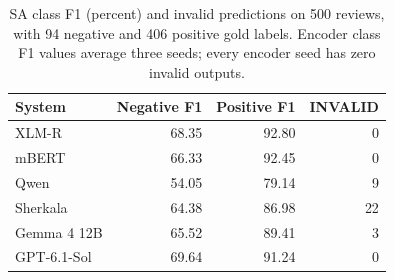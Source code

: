 \begin{table}[t]
\centering\footnotesize
\caption{SA class F1 (percent) and invalid predictions on 500 reviews, with 94 negative and 406 positive gold labels. Encoder class F1 values average three seeds; every encoder seed has zero invalid outputs.}
\label{tab:sa-classes}
\begin{tabular}{lrrr}
\toprule
System & Negative F1 & Positive F1 & INVALID\\
\midrule
XLM-R & 68.35 & 92.80 & 0\\
mBERT & 66.33 & 92.45 & 0\\
Qwen & 54.05 & 79.14 & 9\\
Sherkala & 64.38 & 86.98 & 22\\
Gemma 4 12B & 65.52 & 89.41 & 3\\
GPT-6.1-Sol & 69.64 & 91.24 & 0\\
\bottomrule
\end{tabular}
\end{table}
